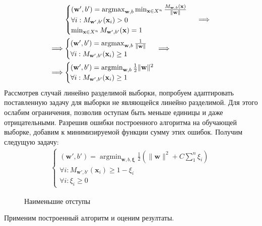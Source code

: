 \documentclass[%
bachelor,    %
subf,        %
href,        %
colorlinks,  %
]{disser}
\let\vec=\mathbf
\DeclareMathOperator*{\argmin}{argmin}
\DeclareMathOperator*{\argmax}{argmax}
\begin{document}
\begin{equation*}
\begin{aligned}
&\begin{gathered}
\begin{cases}
(\vec{w'},b')  =\argmax_{\vec{w},b} \min_{\vec{x} \in X^n} \frac{ M_{\vec{w},b}(\vec{x})}{\|\vec{w}\|}\\
\forall i : M_{\vec{w}',b'}(\vec{x}_i)>0\\
$$\min_{\vec{x} \in X^n} M_{\vec{w}',b'}(\vec{x}) = 1 $$
\end{cases}
\end{gathered}
\implies\\
\implies
&\begin{gathered}
\begin{cases}
(\vec{w'},b')  =\argmax_{\vec{w},b} \frac{1}{\|\vec{w}\|}\\
\forall i : M_{\vec{w}',b'}(\vec{x}_i)\ge 1\\
\end{cases}
\end{gathered}
\implies\\
\implies
&\begin{gathered}
\begin{cases}
(\vec{w'},b')  =\argmin_{\vec{w},b} \frac{1}{2}\|\vec{w}\|^2\\
\forall i : M_{\vec{w}',b'}(\vec{x}_i)\ge 1\\
\end{cases}
\end{gathered}
\end{aligned}
\end{equation*}
Рассмотрев случай линейно разделимой выборки, попробуем адаптировать поставленную задачу для выборки не являющейся линейно разделимой.
Для этого ослабим ограничения, позволив оступам быть меньше единицы и даже отрицательными. Разрешив ошибки построенного алгоритма на обучающей выборке, добавим к минимизируемой функции сумму этих ошибок. Получим следущую задачу:
\begin{equation*}
\begin{gathered}
\begin{cases}
(\vec{w'},b')  =\argmin_{\vec{w},b,\vec{\xi}} \frac{1}{2}(\|\vec{w}\|^2 + C \sum_1^n \xi_i )\\
\forall i: M_{\vec{w}',b'}(\vec{x}_i) \ge 1 - \xi_i  \\
\forall i: \xi_i \ge 0
\end{cases}
\end{gathered}
\end{equation*}
\begin{figure}
	\centering		
	
	\caption{Наименьшие отступы}
	\label{fig:example2}
\end{figure}
Применим построенный алгоритм и оценим резултаты.
\end{document}
